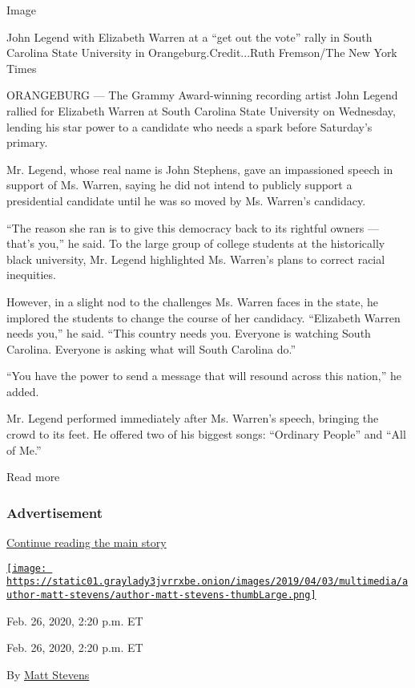 Image

John Legend with Elizabeth Warren at a ``get out the vote'' rally in
South Carolina State University in Orangeburg.Credit...Ruth Fremson/The
New York Times

ORANGEBURG --- The Grammy Award-winning recording artist John Legend
rallied for Elizabeth Warren at South Carolina State University on
Wednesday, lending his star power to a candidate who needs a spark
before Saturday's primary.

Mr. Legend, whose real name is John Stephens, gave an impassioned speech
in support of Ms. Warren, saying he did not intend to publicly support a
presidential candidate until he was so moved by Ms. Warren's candidacy.

``The reason she ran is to give this democracy back to its rightful
owners --- that's you,'' he said. To the large group of college students
at the historically black university, Mr. Legend highlighted Ms.
Warren's plans to correct racial inequities.

However, in a slight nod to the challenges Ms. Warren faces in the
state, he implored the students to change the course of her candidacy.
``Elizabeth Warren needs you,'' he said. ``This country needs you.
Everyone is watching South Carolina. Everyone is asking what will South
Carolina do.''

``You have the power to send a message that will resound across this
nation,'' he added.

Mr. Legend performed immediately after Ms. Warren's speech, bringing the
crowd to its feet. He offered two of his biggest songs: ``Ordinary
People'' and ``All of Me.''

Read more

\hypertarget{advertisement-3}{%
\subsubsection{Advertisement}\label{advertisement-3}}

\protect\hyperlink{after-dfp-ad-mid4}{Continue reading the main story}

\href{https://www.nytimes3xbfgragh.onion/by/matt-stevens}{\texttt{[image: https://static01.graylady3jvrrxbe.onion/images/2019/04/03/multimedia/author-matt-stevens/author-matt-stevens-thumbLarge.png]}}

Feb. 26, 2020, 2:20 p.m. ET

Feb. 26, 2020, 2:20 p.m. ET

By \href{https://www.nytimes3xbfgragh.onion/by/matt-stevens}{Matt
Stevens}

